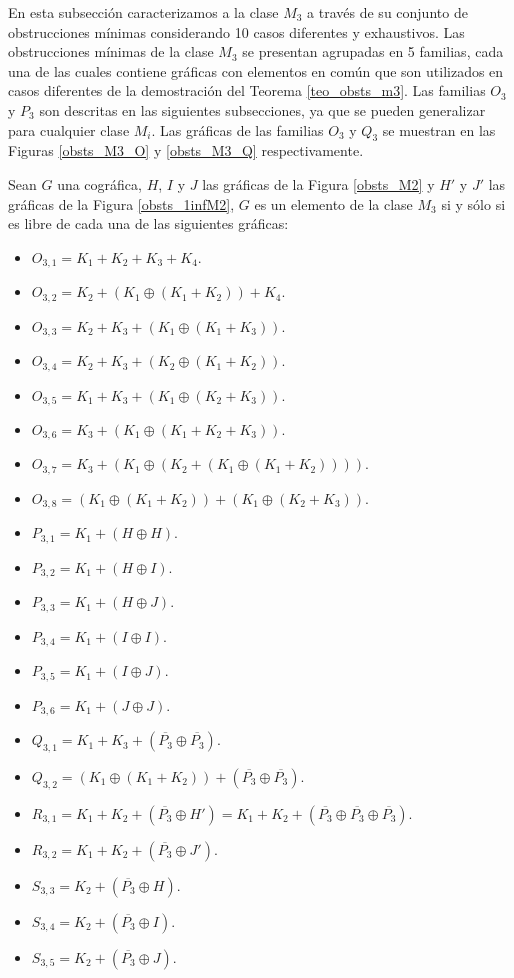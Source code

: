 En esta subsección caracterizamos a la clase $M_3$ a través de su conjunto de obstrucciones mínimas considerando 10 casos diferentes y exhaustivos. Las obstrucciones mínimas de la clase $M_3$ se presentan agrupadas en 5 familias, cada una de las cuales contiene gráficas con elementos en común que son utilizados en casos diferentes de la demostración del Teorema \ref{teo_obsts_m3}. Las familias $O_3$ y $P_3$ son descritas en las siguientes subsecciones, ya que se pueden generalizar para cualquier clase $M_i$. Las gráficas de las familias $O_3$ y $Q_3$ se muestran en las Figuras \ref{obsts_M3_O} y \ref{obsts_M3_Q} respectivamente. 


\begin{theorem} \label{teo_obsts_m3}

    Sean $G$ una cográfica, $H$, $I$ y $J$ las gráficas de la Figura \ref{obsts_M2} y $H'$ y $J'$ las gráficas de la Figura \ref{obsts_1infM2}, $G$ es un elemento de la clase $M_3$ si y sólo si es libre de cada una de las siguientes gráficas:
    \begin{itemize}
        \item $O_{3,1}=K_1+K_2+K_3+K_4$.
        \item $O_{3,2}=K_2+(K_1\oplus(K_1+K_2))+K_4$.
        \item $O_{3,3}=K_2+K_3+(K_1\oplus(K_1+K_3))$.
        \item $O_{3,4}=K_2+K_3+(K_2\oplus(K_1+K_2))$.
        \item $O_{3,5}=K_1+K_3+(K_1\oplus(K_2+K_3))$.
        \item $O_{3,6}=K_3+(K_1\oplus(K_1+K_2+K_3))$.
        \item $O_{3,7}=K_3+(K_1\oplus(K_2+(K_1\oplus(K_1+K_2))))$.
        \item $O_{3,8}=(K_1\oplus(K_1+K_2))+(K_1\oplus(K_2+K_3))$.
        \item $P_{3,1}=K_1+(H\oplus H)$.
        \item $P_{3,2}=K_1+(H\oplus I)$.
        \item $P_{3,3}=K_1+(H\oplus J)$.
        \item $P_{3,4}=K_1+(I\oplus I)$.
        \item $P_{3,5}=K_1+(I\oplus J)$.
        \item $P_{3,6}=K_1+(J\oplus J)$.
        \item $Q_{3,1}=K_1+K_3+(\overline{P_3}\oplus\overline{P_3})$.
        \item $Q_{3,2}=(K_1\oplus(K_1+K_2))+(\overline{P_3}\oplus\overline{P_3})$.
        \item $R_{3,1}=K_1+K_2+(\overline{P_3}\oplus H') = K_1+K_2+(\overline{P_3}\oplus\overline{P_3}\oplus\overline{P_3})$.
        \item $R_{3,2}=K_1+K_2+(\overline{P_3}\oplus J')$.
        \item $S_{3,3}=K_2+(\overline{P_3}\oplus H)$.
        \item $S_{3,4}=K_2+(\overline{P_3}\oplus I)$.
        \item $S_{3,5}=K_2+(\overline{P_3}\oplus J)$.
    \end{itemize}

\end{theorem}

